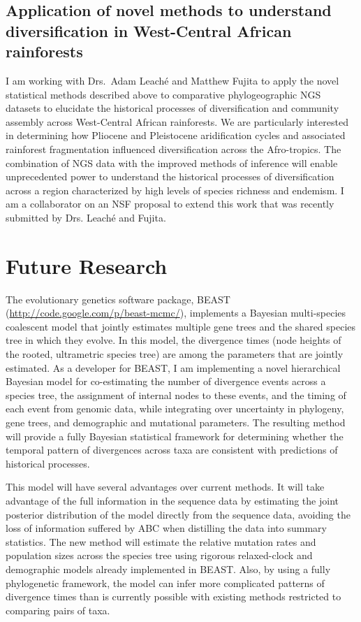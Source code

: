 \documentclass[10pt]{article}
\begin{document}
\subsection*{Application of novel methods to understand diversification
in West-Central African rainforests}
I am working with Drs.\ Adam Leach\'{e} and Matthew Fujita to apply the novel
statistical methods described above to comparative phylogeographic NGS datasets
to elucidate the historical processes of diversification and community assembly
across West-Central African rainforests.
We are particularly interested in determining how Pliocene and Pleistocene
aridification cycles and associated rainforest fragmentation influenced
diversification across the Afro-tropics.
The combination of NGS data with the improved methods of inference will enable
unprecedented power to understand the historical processes of diversification
across a region characterized by high levels of species richness and endemism.
I am a collaborator on an NSF proposal to extend this work that was recently
submitted by Drs. Leach\'{e} and Fujita.


\section*{Future Research}

The evolutionary genetics software package, BEAST
(\url{http://code.google.com/p/beast-mcmc/}), implements a Bayesian
multi-species coalescent model that jointly estimates multiple gene trees and
the shared species tree in which they evolve.
In this model, the divergence times (node heights of the rooted, ultrametric
species tree) are among the parameters that are jointly estimated.
As a developer for BEAST, I am implementing a novel hierarchical Bayesian model
for co-estimating the number of divergence events across a species tree, the
assignment of internal nodes to these events, and the timing of each event from
genomic data, while integrating over uncertainty in phylogeny, gene trees, and
demographic and mutational parameters.
The resulting method will provide a fully Bayesian statistical framework
for determining whether the temporal pattern of divergences across taxa are
consistent with predictions of historical processes.

This model will have several advantages over current methods.
It will take advantage of the full information in the sequence data by
estimating the joint posterior distribution of the model directly from the
sequence data, avoiding the loss of information suffered by ABC when distilling
the data into summary statistics.
The new method will estimate the relative mutation rates and population sizes
across the species tree using rigorous relaxed-clock and demographic models
already implemented in BEAST.
Also, by using a fully phylogenetic framework, the model can infer more
complicated patterns of divergence times than is currently possible with
existing methods restricted to comparing pairs of taxa.
\end{document}
